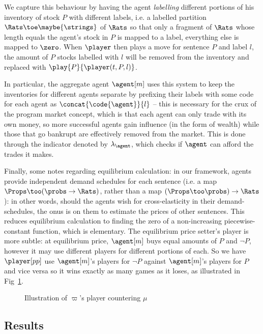 We capture this behaviour by having the agent \emph{labelling} different portions of his inventory of stock $P$ with different labels, i.e. a labelled partition $\Rats\toe\maybe{\strings}$ of $\Rats$ so that only a fragment of $\Rats$ whose length equals the agent's stock in $P$ is mapped to a label, everything else is mapped to $\zero$. When $\player$ then plays a move for sentence $P$ and label $l$, the amount of $P$ stocks labelled with $l$ will be removed from the inventory and replaced with $\play{P}{\player(t,P,l)}$.

In particular, the aggregate agent $\agent[m]$ uses this system to keep the inventories for different agents separate by prefixing their labels with some code for each agent as $\concat{\code{\agent}}{l}$ -- this is necessary for the crux of the program market concept, which is that each agent can only trade with its own money, so more successful agents gain influence (in the form of wealth) while those that go bankrupt are effectively removed from the market. This is done through the indicator denoted by $\lambda_{\agent}$, which checks if $\agent$ can afford the trades it makes.

Finally, some notes regarding equilibrium calculation: in our framework, agents provide independent demand schedules for each sentence (i.e. a map $\Props\too(\probs\to\Rats)$, rather than a map $(\Props\too\probs)\to\Rats$): in other words, should the agents wish for cross-elasticity in their demand-schedules, the onus is on them to estimate the prices of other sentences. This reduces equilibrium calculation to finding the zero of a non-increasing piecewise-constant function, which is elementary. The equilibrium price setter's player is more subtle: at equilibrium price, $\agent[m]$ buys equal amounts of $P$ and $\lnot P$, however it may use different players for different portions of each. So we have $\player[pp]$ use $\agent[m]$'s players for $\lnot P$ against $\agent[m]$'s players for $P$ and vice versa so it wins exactly as many games as it loses, as illustrated in Fig~\ref{nonvf:fig:matchup}.

\begin{figure}
    \centering
    
    \caption{Illustration of $\varpi$'s player countering $\mu$}
    \label{nonvf:fig:matchup}
\end{figure}

\subsection{Results}
\label{nonvf:sec:results}

